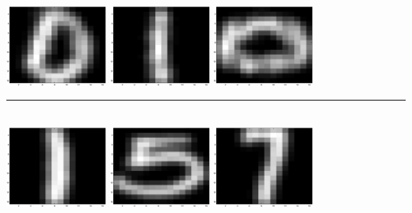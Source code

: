 \documentclass{article}
\begin{document}
\includegraphics[width=0.25\textwidth]{50reconst2.eps}\hspace{0.03\textwidth}%
\includegraphics[width=0.25\textwidth]{50reconst3.eps}\hspace{0.03\textwidth}%
\includegraphics[width=0.25\textwidth]{50reconst4.eps}\\[1em]
\rule{1.09\textwidth}{0.4pt}\\[1em]
\includegraphics[width=0.25\textwidth]{50digits5.eps}\hspace{0.03\textwidth}%
\includegraphics[width=0.25\textwidth]{50digits6.eps}\hspace{0.03\textwidth}%
\includegraphics[width=0.25\textwidth]{50digits7.eps}\hspace{0.03\textwidth}%
\end{document}
